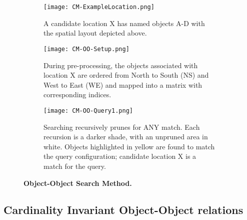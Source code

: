 

\begin{figure*}[h]
    \centering
    \begin{subfigure}[t]{.25\textwidth}
        \texttt{[image: CM-ExampleLocation.png]}
        \caption{\small A candidate location X has named objects A-D with the spatial layout depicted above.}
        \label{fig:CM-Example}
    \end{subfigure}
    \hfill
    \begin{subfigure}[t]{.25\textwidth}
        \texttt{[image: CM-OO-Setup.png]}
        \caption{\small During pre-processing, the objects associated with location X are ordered from North to South (NS) and West to East (WE) and mapped into a matrix with corresponding indices.}
        \label{fig:CM-OO-Setup}
    \end{subfigure}
    \hfill
        \begin{subfigure}[t]{.25\textwidth}
        \texttt{[image: CM-OO-Query1.png]}
        \caption{\small Searching recursively prunes for ANY match. Each recursion is a darker shade, with an unpruned area in white. Objects highlighted in yellow are found to match the query configuration; candidate location X is a match for the query.}
        \label{fig:CM-OO-Query}
    \hfill
    \end{subfigure}
    \caption{\textbf{Object-Object Search Method. }}\label{figure:ConceptMap} 
\end{figure*}

\subsection{Cardinality Invariant Object-Object relations}










